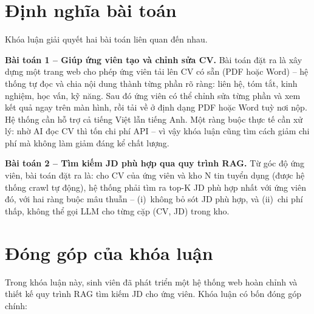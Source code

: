 \documentclass[../DoAn.tex]{subfiles}
\begin{document}
\section{Định nghĩa bài toán}
\label{sec:def_problem}

Khóa luận giải quyết hai bài toán liên quan đến nhau.

\textbf{Bài toán 1 -- Giúp ứng viên tạo và chỉnh sửa CV.} Bài toán đặt ra là xây dựng một trang web cho phép ứng viên tải lên CV có sẵn (PDF hoặc Word) -- hệ thống tự đọc và chia nội dung thành từng phần rõ ràng: liên hệ, tóm tắt, kinh nghiệm, học vấn, kỹ năng. Sau đó ứng viên có thể chỉnh sửa từng phần và xem kết quả ngay trên màn hình, rồi tải về ở định dạng PDF hoặc Word tuỳ nơi nộp. Hệ thống cần hỗ trợ cả tiếng Việt lẫn tiếng Anh. Một ràng buộc thực tế cần xử lý: nhờ AI đọc CV thì tốn chi phí API -- vì vậy khóa luận cũng tìm cách giảm chi phí mà không làm giảm đáng kể chất lượng.

\textbf{Bài toán 2 -- Tìm kiếm JD phù hợp qua quy trình RAG.} Từ góc độ ứng viên, bài toán đặt ra là: cho CV của ứng viên và kho N tin tuyển dụng (được hệ thống crawl tự động), hệ thống phải tìm ra top-K JD phù hợp nhất với ứng viên đó, với hai ràng buộc mâu thuẫn -- (i)~không bỏ sót JD phù hợp, và (ii)~chi phí thấp, không thể gọi LLM cho từng cặp (CV, JD) trong kho.

\section{Đóng góp của khóa luận}
\label{sec:contributions}

Trong khóa luận này, sinh viên đã phát triển một hệ thống web hoàn chỉnh và thiết kế quy trình RAG tìm kiếm JD cho ứng viên. Khóa luận có bốn đóng góp chính:
\end{document}
